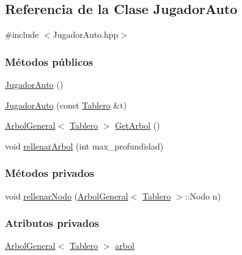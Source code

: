 \hypertarget{classJugadorAuto}{\subsection{Referencia de la Clase Jugador\-Auto}
\label{classJugadorAuto}
}


{\ttfamily \#include $<$Jugador\-Auto.\-hpp$>$}

\subsubsection*{Métodos públicos}
\begin{DoxyCompactItemize}
\item 
\hyperlink{classJugadorAuto_a28f4b4c52165488379729d71237a41a9}{Jugador\-Auto} ()
\item 
\hyperlink{classJugadorAuto_a0c2bc2690a8e6ba93b05a83b9310a03e}{Jugador\-Auto} (const \hyperlink{classTablero}{Tablero} \&t)
\item 
\hyperlink{classArbolGeneral}{Arbol\-General}$<$ \hyperlink{classTablero}{Tablero} $>$ \hyperlink{classJugadorAuto_a74531aa932becde453fe8667f6455413}{Get\-Arbol} ()
\item 
void \hyperlink{classJugadorAuto_a0f1359fcde7d96c91471f1655dfb5bb8}{rellenar\-Arbol} (int max\-\_\-profundidad)
\end{DoxyCompactItemize}
\subsubsection*{Métodos privados}
\begin{DoxyCompactItemize}
\item 
void \hyperlink{classJugadorAuto_ae90fa3f90f9f0357a1e04512e1352f80}{rellenar\-Nodo} (\hyperlink{classArbolGeneral}{Arbol\-General}$<$ \hyperlink{classTablero}{Tablero} $>$\-::Nodo n)
\end{DoxyCompactItemize}
\subsubsection*{Atributos privados}
\begin{DoxyCompactItemize}
\item 
\hyperlink{classArbolGeneral}{Arbol\-General}$<$ \hyperlink{classTablero}{Tablero} $>$ \hyperlink{classJugadorAuto_a0ceb9994f364572f00abf5c490b50319}{arbol}
\end{DoxyCompactItemize}



